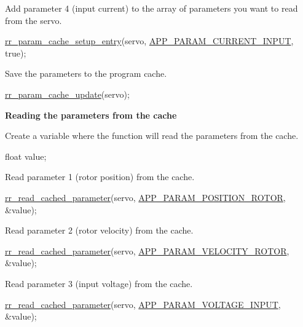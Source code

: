 \begin{DoxyEnumerate}
\item Add parameter 4 (input current) to the array of parameters you want to read from the servo. 
\begin{DoxyCodeInclude}
    \hyperlink{group___realtime_ga770c1e8b4d868cea649592e26a2706dd}{rr\_param\_cache\_setup\_entry}(servo, 
      \hyperlink{api_8h_aa1f58887fab4642cf49f6f453c1d276dafb1be8c565208f94596b980788ac52fe}{APP\_PARAM\_CURRENT\_INPUT}, \textcolor{keyword}{true});
\end{DoxyCodeInclude}

\item Save the parameters to the program cache. 
\begin{DoxyCodeInclude}
    \hyperlink{group___realtime_ga4d9f2bcfc136357405359c9ca9d4aedf}{rr\_param\_cache\_update}(servo);
\end{DoxyCodeInclude}
 {\bfseries  Reading the parameters from the cache }
\item Create a variable where the function will read the parameters from the cache. 
\begin{DoxyCodeInclude}
    \textcolor{keywordtype}{float} value;
\end{DoxyCodeInclude}

\item Read parameter 1 (rotor position) from the cache. 
\begin{DoxyCodeInclude}
    \hyperlink{group___realtime_ga9249202a29031f84b7dc3da37db05dfc}{rr\_read\_cached\_parameter}(servo, 
      \hyperlink{api_8h_aa1f58887fab4642cf49f6f453c1d276daa8dafaaa373617ef2f8585b3d4177115}{APP\_PARAM\_POSITION\_ROTOR}, &value);
\end{DoxyCodeInclude}

\item Read parameter 2 (rotor velocity) from the cache. 
\begin{DoxyCodeInclude}
    \hyperlink{group___realtime_ga9249202a29031f84b7dc3da37db05dfc}{rr\_read\_cached\_parameter}(servo, 
      \hyperlink{api_8h_aa1f58887fab4642cf49f6f453c1d276dade3db1d484cf6dd69b115e37ab77051b}{APP\_PARAM\_VELOCITY\_ROTOR}, &value);
\end{DoxyCodeInclude}

\item Read parameter 3 (input voltage) from the cache. 
\begin{DoxyCodeInclude}
    \hyperlink{group___realtime_ga9249202a29031f84b7dc3da37db05dfc}{rr\_read\_cached\_parameter}(servo, 
      \hyperlink{api_8h_aa1f58887fab4642cf49f6f453c1d276da78bc54701f1fe1ce6b90b70bbfa62483}{APP\_PARAM\_VOLTAGE\_INPUT}, &value);
\end{DoxyCodeInclude}


\end{DoxyEnumerate}
